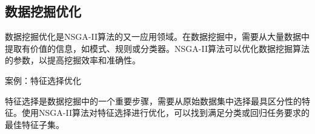 \documentclass[lang=cn,a4paper,citestyle=gb7714-2015, bibstyle=gb7714-2015]{elegantpaper}
\begin{document}
    \subsection{数据挖掘优化}
    数据挖掘优化是NSGA-II算法的又一应用领域。在数据挖掘中，需要从大量数据中提取有价值的信息，如模式、规则或分类器。NSGA-II算法可以优化数据挖掘算法的参数，以提高挖掘效率和准确性。

    案例：特征选择优化

    特征选择是数据挖掘中的一个重要步骤，需要从原始数据集中选择最具区分性的特征。使用NSGA-II算法对特征选择进行优化，可以找到满足分类或回归任务要求的最佳特征子集。


    \nocite{*}
    \printbibliography[heading=bibintoc, title=\ebibname]
\end{document}
